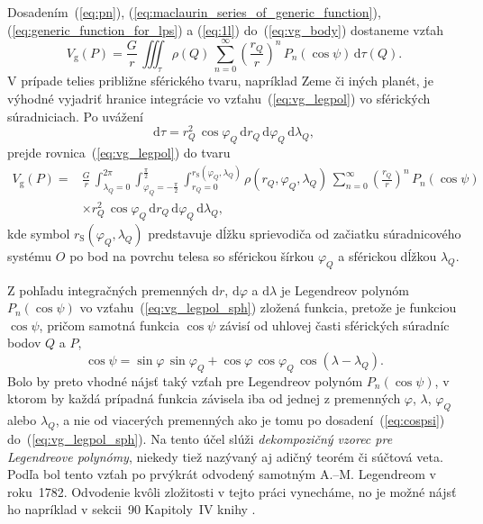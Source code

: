 \documentclass[a4paper, 12pt]{book}
\newcommand{\diff}{\mathrm d}
\newcommand{\gidx}{\mathrm g}
\begin{document}
Dosadením~(\ref{eq:pn}), (\ref{eq:maclaurin_series_of_generic_function}), 
(\ref{eq:generic_function_for_lps}) a (\ref{eq:1l}) do~(\ref{eq:vg_body}) 
dostaneme vzťah
%
\begin{equation}
\label{eq:vg_legpol}
V_\gidx(P) = \frac{G}{r} \, \iiint_{\tau} \rho(Q) \, \sum_{n = 0}^{\infty} 
\left( \frac{r_Q}{r} \right)^n \, P_n(\cos\psi) \, \diff\tau(Q){.}
\end{equation}
%
V prípade telies približne sférického tvaru, napríklad Zeme či iných planét, je 
výhodné vyjadriť hranice integrácie vo vzťahu~(\ref{eq:vg_legpol}) vo 
sférických súradniciach.  Po uvážení
%
\begin{equation}
\diff \tau = r_Q^2 \, \cos\varphi_Q \, \diff r_Q \, \diff\varphi_Q \, 
\diff\lambda_Q{,}
\end{equation}
%
prejde rovnica~(\ref{eq:vg_legpol}) do tvaru
%
\begin{equation}
\label{eq:vg_legpol_sph}
\begin{split}
V_\gidx(P) =& \frac{G}{r} \, \int_{\lambda_Q = 0}^{2\pi} \int_{\varphi_Q 
= -\frac{\pi}{2}}^{\frac{\pi}{2}} \int_{r_Q = 0}^{r_{\mathrm{S}}(\varphi_Q, 
\lambda_Q)} \rho(r_Q, \varphi_Q, \lambda_Q) \, \sum_{n = 0}^{\infty} \left( 
\frac{r_Q}{r} \right)^n \, P_n(\cos\psi)\\
%
&\times r_Q^2 \, \cos\varphi_Q \, \diff r_Q \, \diff\varphi_Q \, 
\diff\lambda_Q{,}
\end{split}
\end{equation}
%
kde symbol $r_\mathrm{S}(\varphi_Q, \lambda_Q)$ predstavuje dĺžku sprievodiča 
od začiatku súradnicového systému $O$ po bod na povrchu telesa so sférickou 
šírkou $\varphi_Q$ a sférickou dĺžkou $\lambda_Q$.

Z pohľadu integračných premenných $\diff r$, $\diff\varphi$ a $\diff\lambda$ je 
Legendreov polynóm $P_n(\cos\psi)$ vo vzťahu~(\ref{eq:vg_legpol_sph}) zložená 
funkcia, pretože je funkciou $\cos\psi$, pričom samotná funkcia $\cos\psi$ 
závisí od uhlovej časti sférických súradníc bodov $Q$ a $P$,
%
\begin{equation}
\label{eq:cospsi}
\cos\psi = \sin\varphi \, \sin\varphi_Q + \cos\varphi \, \cos\varphi_Q \, 
\cos(\lambda - \lambda_Q){.}
\end{equation}
%
Bolo by preto vhodné nájsť taký vzťah pre Legendreov polynóm $P_n(\cos\psi)$, 
v ktorom by každá prípadná funkcia závisela iba od jednej z premenných 
$\varphi$, $ \lambda$, $\varphi_Q$ alebo $\lambda_Q$, a nie od viacerých 
premenných ako je tomu po dosadení~(\ref{eq:cospsi}) 
do~(\ref{eq:vg_legpol_sph}).  Na tento účel slúži \emph{dekompozičný vzorec pre 
Legendreove polynómy}, niekedy tiež nazývaný aj adičný teorém či súčtová veta.  
Podľa \cite{Hobson} bol tento vzťah po prvýkrát odvodený samotným 
A.--M. Legendreom v roku~1782.  Odvodenie kvôli zložitosti v tejto práci 
vynecháme, no je možné nájsť ho napríklad v sekcii~90 Kapitoly~IV knihy 
\cite{Hobson}.
\end{document}
